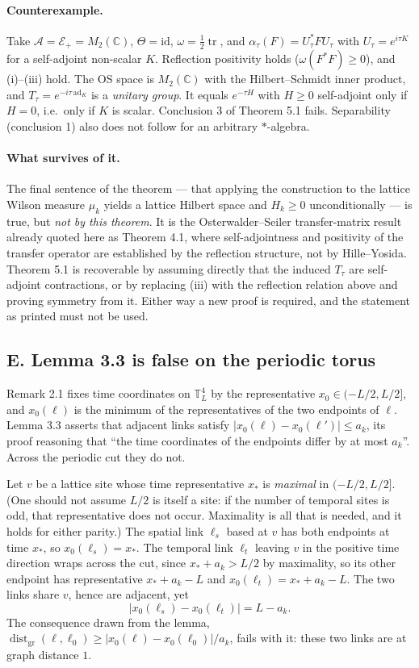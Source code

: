 \documentclass[11pt]{article}
\begin{document}
\paragraph{Counterexample.} Take $\mathcal A=\mathcal E_+=M_2(\mathbb C)$,
$\Theta=\mathrm{id}$, $\omega=\frac12\operatorname{tr}$, and
$\alpha_\tau(F)=U_\tau^*FU_\tau$ with $U_\tau=e^{i\tau K}$ for a self-adjoint
non-scalar $K$. Reflection positivity holds ($\omega(F^*F)\ge0$), and (i)--(iii) hold.
The OS space is $M_2(\mathbb C)$ with the Hilbert--Schmidt inner product, and
$T_\tau=e^{-i\tau\,\mathrm{ad}_K}$ is a \emph{unitary group}. It equals $e^{-\tau H}$
with $H\ge0$ self-adjoint only if $H=0$, i.e.\ only if $K$ is scalar. Conclusion 3 of
Theorem 5.1 fails. Separability (conclusion 1) also does not follow for an arbitrary
$*$-algebra.

\paragraph{What survives of it.} The final sentence of the theorem --- that applying
the construction to the lattice Wilson measure $\mu_k$ yields a lattice Hilbert space
and $H_k\ge0$ unconditionally --- is true, but \emph{not by this theorem}. It is the
Osterwalder--Seiler transfer-matrix result already quoted here as Theorem 4.1, where
self-adjointness and positivity of the transfer operator are established by the
reflection structure, not by Hille--Yosida. Theorem 5.1 is recoverable by assuming
directly that the induced $T_\tau$ are self-adjoint contractions, or by replacing
(iii) with the reflection relation above and proving symmetry from it. Either way a
new proof is required, and the statement as printed must not be used.

\subsection{E. Lemma 3.3 is false on the periodic torus}

Remark 2.1 fixes time coordinates on $\mathbb T^4_L$ by the representative
$x_0\in(-L/2,L/2]$, and $x_0(\ell)$ is the minimum of the representatives of the two
endpoints of $\ell$. Lemma 3.3 asserts that adjacent links satisfy
$|x_0(\ell)-x_0(\ell')|\le a_k$, its proof reasoning that ``the time coordinates of
the endpoints differ by at most $a_k$''. Across the periodic cut they do not.

Let $v$ be a lattice site whose time representative $x_*$ is \emph{maximal} in
$(-L/2,L/2]$. (One should not assume $L/2$ is itself a site: if the number of temporal
sites is odd, that representative does not occur. Maximality is all that is needed,
and it holds for either parity.) The spatial link $\ell_s$ based at $v$ has both
endpoints at time $x_*$, so $x_0(\ell_s)=x_*$. The temporal link $\ell_t$ leaving $v$
in the positive time direction wraps across the cut, since $x_*+a_k>L/2$ by
maximality, so its other endpoint has representative $x_*+a_k-L$ and
$x_0(\ell_t)=x_*+a_k-L$. The two links share $v$, hence are adjacent, yet
\[
|x_0(\ell_s)-x_0(\ell_t)|=L-a_k .
\]
The consequence drawn from the lemma,
$\operatorname{dist}_{\mathrm{gr}}(\ell,\ell_0)\ge|x_0(\ell)-x_0(\ell_0)|/a_k$, fails
with it: these two links are at graph distance $1$.
\end{document}
